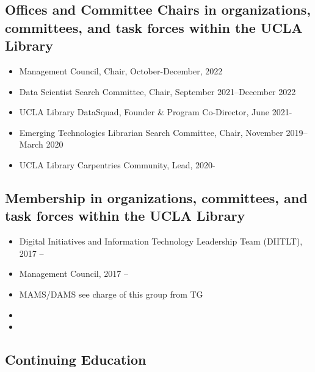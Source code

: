 
\subsection{Offices and Committee Chairs in organizations, committees, and task forces within the UCLA Library}

\begin{itemize}[label={},leftmargin=!,labelindent=5pt,itemindent=-15pt]
 \item Management Council, Chair, October-December, 2022 
  \item Data Scientist Search Committee, Chair, September 2021--December 2022
   \item UCLA Library DataSquad, Founder & Program Co-Director, June 2021- 
  \item Emerging Technologies Librarian Search Committee, Chair, November 2019--March 2020
  \item UCLA Library Carpentries Community, Lead, 2020-
\end{itemize}


\subsection{Membership in organizations, committees, and task forces within the UCLA Library}

\begin{itemize}[label={},leftmargin=!,labelindent=5pt,itemindent=-15pt]
   \item Digital Initiatives and Information Technology Leadership Team (DIITLT), 2017 --
    \item Management Council, 2017 --
    \item MAMS/DAMS 
    \todo see charge of this group from TG 
    \item 
    \item 
\end{itemize}

\subsection{Continuing Education}


